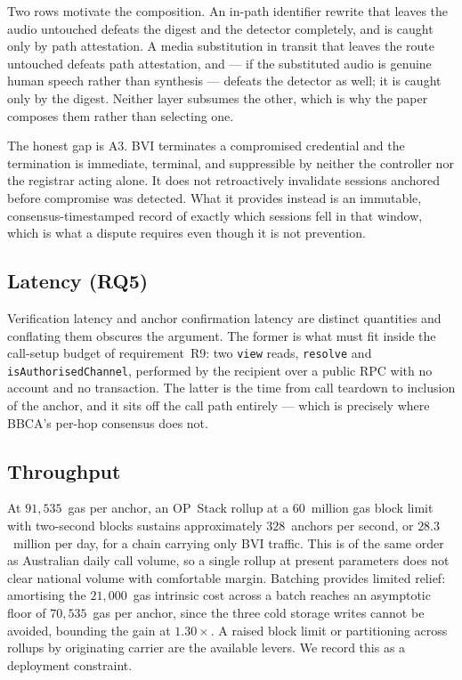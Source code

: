 Two rows motivate the composition. An in-path identifier rewrite that leaves
the audio untouched defeats the digest and the detector completely, and is
caught only by path attestation. A media substitution in transit that leaves
the route untouched defeats path attestation, and --- if the substituted audio
is genuine human speech rather than synthesis --- defeats the detector as well;
it is caught only by the digest. Neither layer subsumes the other, which is why
the paper composes them rather than selecting one.

The honest gap is A3. BVI terminates a compromised credential and the
termination is immediate, terminal, and suppressible by neither the controller
nor the registrar acting alone. It does not retroactively invalidate sessions
anchored before compromise was detected. What it provides instead is an
immutable, consensus-timestamped record of exactly which sessions fell in that
window, which is what a dispute requires even though it is not prevention.

\subsection{Latency (RQ5)}

Verification latency and anchor confirmation latency are distinct quantities
and conflating them obscures the argument. The former is what must fit inside
the call-setup budget of requirement~R9: two \texttt{view} reads,
\texttt{resolve} and \texttt{isAuthorisedChannel}, performed by the recipient
over a public RPC with no account and no transaction. The latter is the time
from call teardown to inclusion of the anchor, and it sits off the call path
entirely --- which is precisely where BBCA's per-hop consensus does not.

\subsection{Throughput}

At $91{,}535$~gas per anchor, an OP~Stack rollup at a $60$~million gas block
limit with two-second blocks sustains approximately $328$~anchors per second,
or $28.3$~million per day, for a chain carrying only BVI traffic. This is of
the same order as Australian daily call volume, so a single rollup at present
parameters does not clear national volume with comfortable margin. Batching
provides limited relief: amortising the $21{,}000$~gas intrinsic cost across a
batch reaches an asymptotic floor of $70{,}535$~gas per anchor, since the three
cold storage writes cannot be avoided, bounding the gain at $1.30\times$. A
raised block limit or partitioning across rollups by originating carrier are
the available levers. We record this as a deployment constraint.

